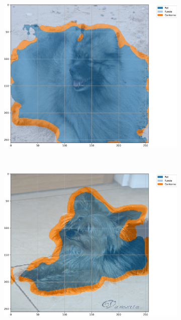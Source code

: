 \begin{figure}[H]
    \centering
    \caption[Segmentação com U-Net, \textit{Max Pooling}, 500 épocas, \textit{Oxford-IIIT Pets}, mIoU]{Exemplos segmentados a partir de U-Net com \textit{Max Pooling} e 500 épocas no conjunto de dados \textit{Oxford-IIIT Pets} baseada em mIoU.}
    \label{results:fig:semantic:2}
     \begin{subfigure}[t]{0.32\textwidth}
         \centering
         \includegraphics[width=1\linewidth]{recursos/imagens/results/max_miou_unet500_image_0_overlayed_segmentation.png}
         \label{results:fig:semantic:2.1}
     \end{subfigure}%
     ~ 
     \begin{subfigure}[t]{0.32\textwidth}
         \centering
         \includegraphics[width=1\linewidth]{recursos/imagens/results/max_miou_unet500_image_1_overlayed_segmentation.png}

\end{subfigure}
\end{figure}
